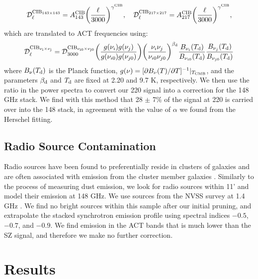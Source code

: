 \documentclass[a4paper,fleqn,usenatbib]{mnras}
\begin{document}
\begin{equation}
\mathcal{D}_{\ell}^{\rm CIB_{143 \times 143}} = A^{\rm CIB}_{143} \bigg(\frac{\ell}{3000}\bigg)^{\gamma^{\rm CIB}}, \quad
\mathcal{D}_{\ell}^{\rm CIB_{217 \times 217}} = A^{\rm CIB}_{217} \bigg(\frac{\ell}{3000}\bigg)^{\gamma^{\rm CIB}},
\end{equation}
which are translated to ACT frequencies using:
\begin{equation}
\mathcal{D}^{\rm CIB_{\nu_{i} \times \nu_{j}}}_{\ell} = \mathcal{D}^{\rm CIB_{\nu_{i0} \times \nu_{j0}}}_{3000} \bigg( \frac{g(\nu_{i})g(\nu_{j})}{g(\nu_{i0})g(\nu_{j0})} \bigg) \bigg( \frac{\nu_{i} \nu_{j}}{\nu_{i0} \nu_{j0}} \bigg)^{\beta_{\rm d}} \frac{B_{\nu_{i}}(T_{\rm d})}{B_{\nu_{i0}}(T_{\rm d})} \frac{B_{\nu_{j}}(T_{\rm d})}{B_{\nu_{j0}}(T_{\rm d})}
\end{equation}
\newline 
where $B_{\nu}(T_{\rm d})$ is the Planck function, $g(\nu) = [\partial B_{\nu}(T)/\partial T]^{-1}|_{T_{\rm CMB}}$, and the parameters $\beta_{\rm d}$ and $T_{\rm d}$ are fixed at 2.20 and 9.7 K, respectively.
We then use the ratio in the power spectra to convert our 220 signal into a correction for the 148 GHz stack. We find with this method that 28 $\pm$ 7\% of the signal at 220 is carried over into the 148 stack, in agreement with the value of $\alpha$ we found from the Herschel fitting.



\subsection{Radio Source Contamination}
Radio sources have been found to preferentially reside in clusters of galaxies and are often associated with emission from the cluster member galaxies \citep{2002ApJ...580...36H,2007ApJS..170...71L,2007AJ....134..897C,2009ApJ...694..992L}. Similarly to the process of measuring dust emission, we look for radio sources within 11' and model their emission at 148 GHz. We use sources from the NVSS survey at 1.4 GHz \citep{1998AJ....115.1693C}. We find no bright sources within this sample after our initial pruning, and extrapolate the stacked synchrotron emission profile using spectral indices $-0.5$, $-0.7$, and $-0.9$. We find emission in the ACT bands that is much lower than the SZ signal, and therefore we make no further correction.



\section{Results} \label{sec:results}
\end{document}
